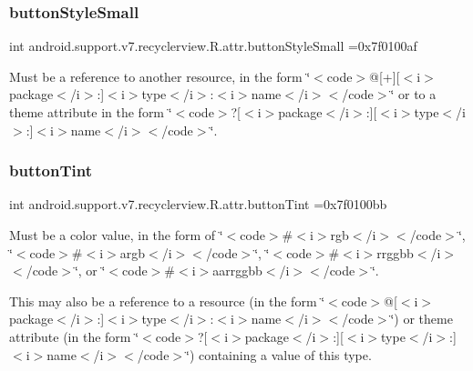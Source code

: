 \subsubsection{\texorpdfstring{button\+Style\+Small}{buttonStyleSmall}}
{\footnotesize\ttfamily int android.\+support.\+v7.\+recyclerview.\+R.\+attr.\+button\+Style\+Small =0x7f0100af\hspace{0.3cm}{\ttfamily [static]}}

Must be a reference to another resource, in the form \char`\"{}$<$code$>$@\mbox{[}+\mbox{]}\mbox{[}$<$i$>$package$<$/i$>$\+:\mbox{]}$<$i$>$type$<$/i$>$\+:$<$i$>$name$<$/i$>$$<$/code$>$\char`\"{} or to a theme attribute in the form \char`\"{}$<$code$>$?\mbox{[}$<$i$>$package$<$/i$>$\+:\mbox{]}\mbox{[}$<$i$>$type$<$/i$>$\+:\mbox{]}$<$i$>$name$<$/i$>$$<$/code$>$\char`\"{}. \mbox{\label{classandroid_1_1support_1_1v7_1_1recyclerview_1_1R_1_1attr_a73c37739f10b2e3054fe2d2db7c19b96}} 
\subsubsection{\texorpdfstring{button\+Tint}{buttonTint}}
{\footnotesize\ttfamily int android.\+support.\+v7.\+recyclerview.\+R.\+attr.\+button\+Tint =0x7f0100bb\hspace{0.3cm}{\ttfamily [static]}}

Must be a color value, in the form of \char`\"{}$<$code$>$\#$<$i$>$rgb$<$/i$>$$<$/code$>$\char`\"{}, \char`\"{}$<$code$>$\#$<$i$>$argb$<$/i$>$$<$/code$>$\char`\"{}, \char`\"{}$<$code$>$\#$<$i$>$rrggbb$<$/i$>$$<$/code$>$\char`\"{}, or \char`\"{}$<$code$>$\#$<$i$>$aarrggbb$<$/i$>$$<$/code$>$\char`\"{}. 

This may also be a reference to a resource (in the form \char`\"{}$<$code$>$@\mbox{[}$<$i$>$package$<$/i$>$\+:\mbox{]}$<$i$>$type$<$/i$>$\+:$<$i$>$name$<$/i$>$$<$/code$>$\char`\"{}) or theme attribute (in the form \char`\"{}$<$code$>$?\mbox{[}$<$i$>$package$<$/i$>$\+:\mbox{]}\mbox{[}$<$i$>$type$<$/i$>$\+:\mbox{]}$<$i$>$name$<$/i$>$$<$/code$>$\char`\"{}) containing a value of this type. \mbox{\label{classandroid_1_1support_1_1v7_1_1recyclerview_1_1R_1_1attr_ade22c6179aa64bcf0e9a978032dab998}} 
